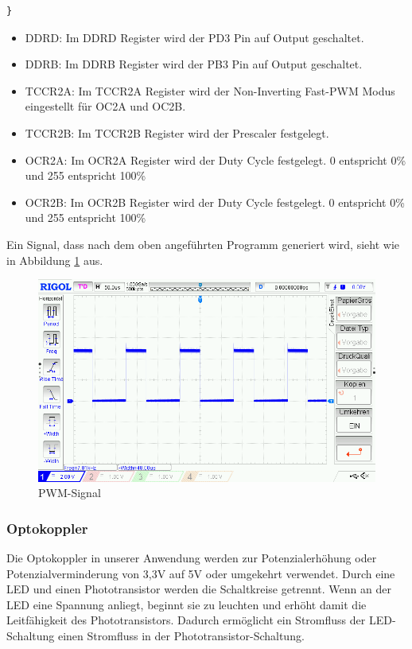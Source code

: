 \begin{itemize}
\begin{lstlisting}[caption=$\mu$C-Programm,style=C]
}
\end{lstlisting}
\newpage
\begin{itemize}
\item DDRD: Im DDRD Register wird der PD3 Pin auf Output geschaltet.
\item DDRB: Im DDRB Register wird der PB3 Pin auf Output geschaltet.
\item TCCR2A: Im TCCR2A Register wird der Non-Inverting Fast-\ac{PWM} Modus eingestellt für OC2A und OC2B. 
\item TCCR2B: Im TCCR2B Register wird der Prescaler festgelegt. 
\item OCR2A: Im OCR2A Register wird der Duty Cycle festgelegt. 0 entspricht 0\% und 255 entspricht 100\% 
\item OCR2B: Im OCR2B Register wird der Duty Cycle festgelegt. 0 entspricht 0\% und 255 entspricht 100\% 
\end{itemize}
\end{itemize}

Ein Signal, dass nach dem oben angeführten Programm generiert wird, sieht wie in Abbildung \ref{PWM} aus.
\begin{figure}[H] 
\begin{center}

\includegraphics[width=13cm]{Bilder/PWM/PWM}
\caption{PWM-Signal}
\label{PWM}

\end{center}
\end{figure}
\newpage
\subsubsection{Optokoppler}

Die Optokoppler in unserer Anwendung werden zur Potenzialerhöhung oder Potenzialverminderung von 3,3V auf 5V oder umgekehrt verwendet. Durch eine LED und einen Phototransistor werden die Schaltkreise getrennt. Wenn an der LED eine Spannung anliegt, beginnt sie zu leuchten und erhöht damit die Leitfähigkeit des Phototransistors. Dadurch ermöglicht ein Stromfluss der LED-Schaltung einen Stromfluss in der Phototransistor-Schaltung.

